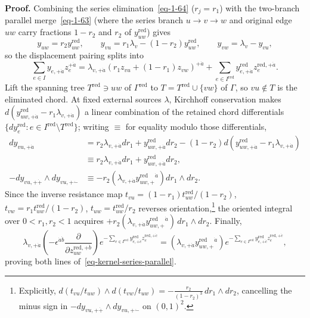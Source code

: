 \documentclass[11pt]{article}
\numberwithin{equation}{section}
\numberwithin{figure}{section}
\numberwithin{table}{section}
\begin{document}
\begin{proofbox}
\textbf{Proof.} Combining the series elimination~\eqref{eq-1-64} ($r_j=r_1$) with the two-branch parallel merge~\eqref{eq-1-63} (where the series branch $u\to v\to w$ and original edge $uw$ carry fractions $1-r_2$ and $r_2$ of $y_{uw}^{\mathrm{red}}$) gives
\begin{equation}\label{b-01151}
y_{uw}=r_2y_{uw}^{\mathrm{red}},\qquad
y_{vu}=r_1\lambda_v-(1-r_2)y_{uw}^{\mathrm{red}},\qquad
y_{vw}=\lambda_v-y_{vu},
\end{equation}
so the displacement pairing splits into
\begin{equation*}
\sum_{e\in I}y_{e,+\dot a}z_e^{+\dot a}
=\lambda_{v,+\dot a}(r_1z_{vu}+(1-r_1)z_{vw})^{+\dot a}
+\sum_{e\in I^{\mathrm{red}}}
y_{e,+\dot a}^{\mathrm{red}}z_e^{\mathrm{red},+\dot a}.
\end{equation*}
Lift the spanning tree $T^{\mathrm{red}}\ni uw$ of $\Gamma^{\mathrm{red}}$ to $T=T^{\mathrm{red}}\cup\{vw\}$ of $\Gamma$, so $vu\notin T$ is the eliminated chord. At fixed external sources $\lambda$, Kirchhoff conservation makes $d(y_{uw,+\dot a}^{\mathrm{red}}-r_1\lambda_{v,+\dot a})$ a linear combination of the retained chord differentials $\{dy_e^{\mathrm{red}}:e\in I^{\mathrm{red}}\setminus T^{\mathrm{red}}\}$; writing $\equiv$ for equality modulo those differentials,
\begin{equation*}
\begin{aligned}
dy_{vu,+\dot a}
&=r_2\lambda_{v,+\dot a}dr_1+y_{uw,+\dot a}^{\mathrm{red}}dr_2
-(1-r_2)d\!\left(y_{uw,+\dot a}^{\mathrm{red}}-r_1\lambda_{v,+\dot a}\right)\\
&\equiv r_2\lambda_{v,+\dot a}dr_1+y_{uw,+\dot a}^{\mathrm{red}}dr_2,\\
-dy_{vu,+\dot+}\wedge dy_{vu,+\dot-}
&\equiv -r_2\left(\lambda_{v,+\dot a}y_{uw,+}^{\mathrm{red}}{}^{\dot a}\right)
 dr_1\wedge dr_2.
\end{aligned}
\end{equation*}
Since the inverse resistance map $t_{vu}=(1-r_1)t_{uw}^{\mathrm{red}}/(1-r_2)$, $t_{vw}=r_1t_{uw}^{\mathrm{red}}/(1-r_2)$, $t_{uw}=t_{uw}^{\mathrm{red}}/r_2$ reverses orientation,\footnote{Explicitly, $d(t_{vu}/t_{uw})\wedge d(t_{vw}/t_{uw})=-\frac{r_2}{(1-r_2)^3}\,dr_1\wedge dr_2$, cancelling the minus sign in $-dy_{vu,+\dot+}\wedge dy_{vu,+\dot-}$ on $(0,1)^2$.} the oriented integral over $0<r_1,r_2<1$ acquires $+r_2(\lambda_{v,+\dot a}y_{uw,+}^{\mathrm{red}}{}^{\dot a})\,dr_1\wedge dr_2$. Finally,
\begin{equation*}
\lambda_{v,+\dot a}\left(-\epsilon^{\dot a\dot b}
\frac{\partial}{\partial z_{uw}^{\mathrm{red},+\dot b}}\right)
e^{-\sum_{e\in I^{\mathrm{red}}}y_{e,+\dot c}^{\mathrm{red}}z_e^{\mathrm{red},+\dot c}}
=(\lambda_{v,+\dot a}y_{uw,+}^{\mathrm{red}}{}^{\dot a})
e^{-\sum_{e\in I^{\mathrm{red}}}y_{e,+\dot c}^{\mathrm{red}}z_e^{\mathrm{red},+\dot c}},
\end{equation*}
proving both lines of~\eqref{eq-kernel-series-parallel}.~\hfill\qedsymbol
\end{proofbox}
\end{document}
